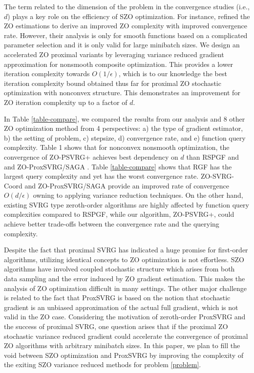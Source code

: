 The term related to the dimension of the problem in the convergence studies (i.e., $d$) plays a key role on the efficiency of SZO optimization. For instance, \cite{ji2019improved} refined the ZO estimations to derive an improved ZO complexity with improved convergence rate. However, their analysis is only for smooth functions based on a complicated parameter selection and it is only valid for large minibatch sizes.
We design an accelerated ZO proximal variants by leveraging variance reduced gradient approximation for nonsmooth composite optimization. This provides a lower iteration complexity towards $O(1/\epsilon )$, which is to our knowledge the best iteration complexity bound obtained thus far for proximal ZO stochastic optimization with nonconvex structure. This demonstrates an improvement for ZO iteration complexity up to a factor of ${d}$.

In Table \ref{table-compare}, we compared the results from our analysis and 8 other ZO optimization method from 4 perspectives: a) the type of gradient estimator, b) the setting of problem, c) stepsize, d) convergence rate, and e) function query complexity. Table 1 shows that for nonconvex nonsmooth optimization, the convergence of ZO-PSVRG+
achieves best dependency on $d$ than RSPGF and and ZO-ProxSVRG/SAGA \cite{huang2019faster}. Table \ref{table-compare} shows that RGF \cite{nesterov2017random} has the largest query complexity and yet has the worst convergence rate. ZO-SVRG-Coord \cite{ghadimi2016accelerated} and ZO-ProxSVRG/SAGA provide an improved rate of convergence $O(d/\epsilon )$ owning to applying variance reduction techniques. On the other hand, existing SVRG type zeroth-order algorithms are highly affected by function query complexities compared to RSPGF, while our algorithm, ZO-PSVRG+, could achieve better trade-offs between the convergence rate and the querying complexity.

Despite the fact that proximal SVRG has indicated a huge promise for first-order algorithms, utilizing identical concepts to ZO optimization is not effortless. SZO algorithms have involved coupled stochastic structure which arises from both data sampling and the error induced by ZO gradient estimation. This makes the analysis of ZO optimization difficult in many settings. The other major challenge is related to the fact that ProxSVRG is based on the notion that stochastic gradient is an unbiased approximation of the actual full gradient, which is not valid in the ZO case. 
Considering the motivation of zeroth-order ProxSVRG and the success of proximal SVRG, one
question arises that if the proximal ZO stochastic variance reduced gradient could accelerate the convergence of proximal ZO algorithms with arbitrary minibatch sizes.
In this paper, we plan to fill the void between
SZO optimization and ProxSVRG by improving the complexity of the exiting SZO variance reduced methods for problem \eqref{problem}.


